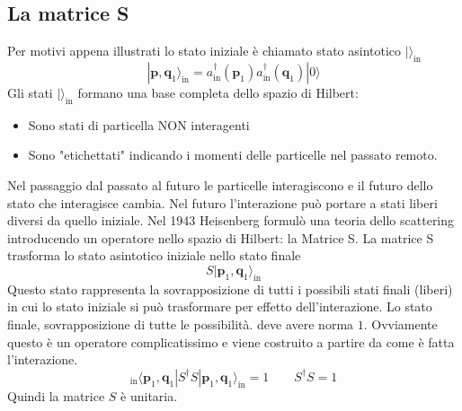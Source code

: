 \subsection{La matrice S}
Per motivi appena illustrati lo stato iniziale è chiamato stato asintotico $|\rangle_{\text{in}}$
$$
|\mathbf{p}, \mathbf{q}_1\rangle_{\text{in}} = a_{\text{in}}^\dagger(\mathbf{p}_1) a_{\text{in}}^\dagger(\mathbf{q}_1) |0\rangle
$$
Gli stati $|\rangle_{\text{in}}$ formano una base completa dello spazio di Hilbert:
\begin{itemize}
    \item Sono stati di particella NON interagenti
    \item Sono "etichettati" indicando i momenti delle particelle nel passato remoto.
\end{itemize}
Nel passaggio dal passato al futuro le particelle interagiscono e il futuro dello stato che interagisce cambia. Nel futuro l'interazione può portare a stati liberi diversi da quello iniziale. Nel 1943 Heisenberg formulò una teoria dello scattering introducendo un operatore nello spazio di Hilbert: la Matrice S. La matrice S trasforma lo stato asintotico iniziale nello stato finale
$$
S |\mathbf{p}_1,\mathbf{q}_1\rangle_{\text{in}}
$$
Questo stato rappresenta la sovrapposizione di tutti i possibili stati finali (liberi) in cui lo stato iniziale si può trasformare per effetto dell'interazione. Lo stato finale, sovrapposizione di tutte le possibilità. deve avere norma $1$. Ovviamente questo è un operatore complicatissimo e viene costruito a partire da come è fatta l'interazione.
$$
{}_{\text{in}}\langle\mathbf{p}_1,\mathbf{q}_1 | S^\dagger S | \mathbf{p}_1,\mathbf{q}_1 \rangle_{\text{in}} = 1 \qquad S^\dagger S = 1
$$
Quindi la matrice $S$ è unitaria.

